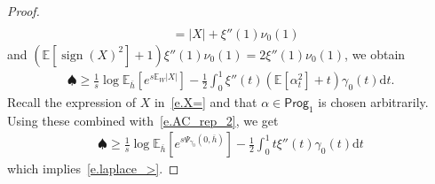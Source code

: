 \documentclass[11pt]{amsart}
\theoremstyle{remark}
\theoremstyle{definition}
\numberwithin{equation}{section}
\numberwithin{proposition}{section}
\numberwithin{figure}{section}
\numberwithin{table}{section}
\newcommand{\N}{\mathbb{N}}
\newcommand{\E}{\mathbb{E}}
\renewcommand{\geq}{\geqslant}
\renewcommand{\bar}{\overline}
\newcommand{\Ll}{\left}
\newcommand{\Rr}{\right}
\renewcommand{\d}{\mathrm{d}}
\newcommand{\1}{\mathbf{1}}
\newcommand{\mcl}{\mathcal}
\DeclareMathOperator{\sign}{sign}
\newcommand{\prog}{\mathsf{Prog}}
\newcommand{\cM}{\mathcal{M}}
\begin{document}
\begin{proof}
\begin{align*}
    \\
    & =|X|+\xi''(1)\nu_0(1)
\end{align*}
and $\Ll(\E\Ll[\sign(X)^2\Rr]+1\Rr)\xi''(1)\nu_0(1)=2\xi''(1)\nu_0(1)$, we obtain
\begin{align*}
    \spadesuit \geq \frac{1}{s}\log\E_{\bar h}\Ll[e^{s\E_W\Ll|X\Rr|}\Rr]
    -\frac{1}{2}\int_0^1 \xi''(t)\Ll(\E[\alpha^2_t]+t\Rr)\gamma_0(t)\d t .
\end{align*}
Recall the expression of $X$ in~\eqref{e.X=} and that $\alpha\in\prog_1$ is chosen arbitrarily. Using these combined with~\eqref{e.AC_rep_2}, we get
\begin{align*}
    \spadesuit \geq \frac{1}{s}\log\E_{\bar h}\Ll[e^{s\Psi_{\gamma_0}(0,\bar h)}\Rr]
    -\frac{1}{2}\int_0^1 t\xi''(t)\gamma_0(t)\d t
\end{align*}
which implies~\eqref{e.laplace_>}.
\end{proof}







\end{document}
